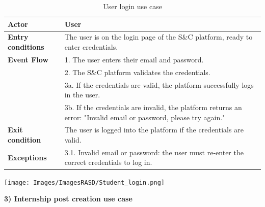 \begin{table}[h!]
    \centering
    \begin{tabular}{lp{10cm}}
        \textbf{Actor} & User \\ \hline
        \textbf{Entry conditions} & The user is on the login page of the S\&C platform, ready to enter credentials. \\ \hline
        \textbf{Event Flow} & 
        1. The user enters their email and password. \\
        & 2. The S\&C platform validates the credentials. \\
        & 3a. If the credentials are valid, the platform successfully logs in the user. \\
        & 3b. If the credentials are invalid, the platform returns an error: "Invalid email or password, please try again." \\
        \hline
        \textbf{Exit condition} & The user is logged into the platform if the credentials are valid. \\ \hline
        \textbf{Exceptions} & 
        3.1. Invalid email or password: the user must re-enter the correct credentials to log in. \\
    \end{tabular}
    \caption{User login use case}
    \label{tab:user_login}
\end{table}


\begin{center}
    \texttt{[image: Images/ImagesRASD/Student\_login.png]}
\end{center}

\newpage
\textbf{3) Internship post creation use case}\\

